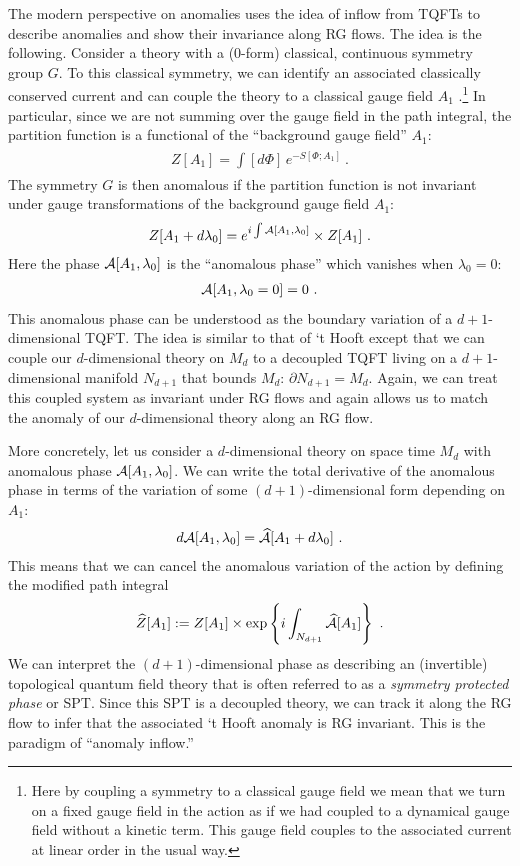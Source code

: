 \documentclass[11pt]{article}
\newcommand{\eq}[1]{\begin{align}\begin{split}#1\end{split}\end{align}}
\def\CA{{\cal A}}
\begin{document}
The modern perspective on anomalies uses the idea of inflow from TQFTs to describe anomalies and show their invariance along RG flows. The idea is the following. Consider a theory with a (0-form) classical, continuous symmetry group $G$. To this classical symmetry, we can identify an associated classically conserved current and can couple the theory to a classical gauge field $A_1$ .\footnote{Here by coupling a symmetry to a classical gauge field we mean that we turn on a fixed gauge field in the action as if we had coupled to a dynamical gauge field without a kinetic term. This gauge field couples to the associated current at linear order in the usual way. 
} In particular, since we are not summing over the gauge field in the path integral, the partition function is a functional of the ``background gauge field'' $A_1$:
\eq{
Z[A_1]=\int[d\Phi]\,e^{-S[\Phi;A_1]}~. 
}
The symmetry $G$ is then anomalous if the partition function is not invariant under gauge transformations of the background gauge field $A_1$: 
\eq{
Z[A_1+d\lambda_0]=e^{ i \int \CA [A_1,\lambda_0]}\times Z[A_1]~. 
}
Here the phase $\CA[A_1,\lambda_0]$ is the ``anomalous phase'' which vanishes when $\lambda_0=0$:
\eq{
\CA [A_1,\lambda_0=0]=0~. 
} 
This anomalous phase can be understood as the boundary variation of a $d+1$-dimensional TQFT. The idea is similar to that of `t Hooft except that we can couple our $d$-dimensional theory on $M_d$ to a decoupled TQFT living on a $d+1$-dimensional manifold $N_{d+1}$ that bounds $M_d$: $\partial N_{d+1}=M_d$. Again, we can treat this coupled system as invariant under RG flows and again allows us to match the anomaly of our $d$-dimensional theory along an RG flow.

More concretely, let us consider a $d$-dimensional theory on space time $M_d$ with anomalous phase $\CA [A_1,\lambda_0]$. We can write the total derivative of the anomalous phase in terms of the variation of some $(d+1)$-dimensional form depending on $A_1$:
\eq{
d\CA[A_1,\lambda_0]=\widehat\CA[A_1+d\lambda_0]~.
}
This means that we can cancel the anomalous variation of the action by defining the modified path integral
\eq{
\widehat{Z}[A_1]:=Z[A_1]\times {\rm exp}\left\{ i \int_{N_{d+1}}\widehat\CA[A_1]\right\}~.
}
We can interpret the $(d+1)$-dimensional phase as describing an (invertible) topological quantum field theory that is often referred to as a \emph{symmetry protected phase} or SPT. Since this SPT is a decoupled theory, we can track it along the RG flow to infer that the associated `t Hooft anomaly is RG invariant. This is the paradigm of ``anomaly inflow.''
\end{document}

